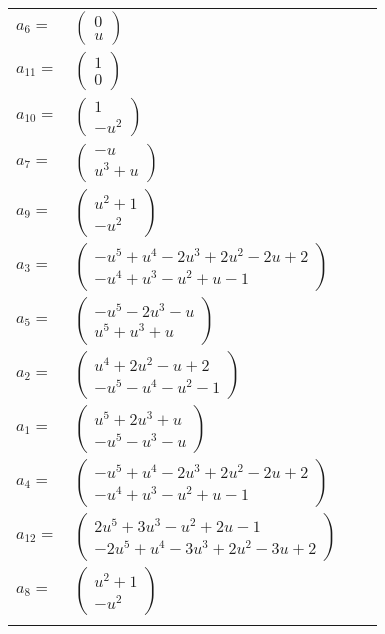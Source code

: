 \documentclass[1p]{elsarticle_modified}
\theoremstyle{definition}
\begin{document}
\begin{tabular}{m{7pt} m{180pt} m{7pt} m{180pt} }
\flushright $a_{6}=$&$\begin{pmatrix}0\\u\end{pmatrix}$ \\
\flushright $a_{11}=$&$\begin{pmatrix}1\\0\end{pmatrix}$ \\
\flushright $a_{10}=$&$\begin{pmatrix}1\\- u^2\end{pmatrix}$ \\
\flushright $a_{7}=$&$\begin{pmatrix}- u\\u^3+u\end{pmatrix}$ \\
\flushright $a_{9}=$&$\begin{pmatrix}u^2+1\\- u^2\end{pmatrix}$ \\
\flushright $a_{3}=$&$\begin{pmatrix}- u^5+u^4-2 u^3+2 u^2-2 u+2\\- u^4+u^3- u^2+u-1\end{pmatrix}$ \\
\flushright $a_{5}=$&$\begin{pmatrix}- u^5-2 u^3- u\\u^5+u^3+u\end{pmatrix}$ \\
\flushright $a_{2}=$&$\begin{pmatrix}u^4+2 u^2- u+2\\- u^5- u^4- u^2-1\end{pmatrix}$ \\
\flushright $a_{1}=$&$\begin{pmatrix}u^5+2 u^3+u\\- u^5- u^3- u\end{pmatrix}$ \\
\flushright $a_{4}=$&$\begin{pmatrix}- u^5+u^4-2 u^3+2 u^2-2 u+2\\- u^4+u^3- u^2+u-1\end{pmatrix}$ \\
\flushright $a_{12}=$&$\begin{pmatrix}2 u^5+3 u^3- u^2+2 u-1\\-2 u^5+u^4-3 u^3+2 u^2-3 u+2\end{pmatrix}$ \\
\flushright $a_{8}=$&$\begin{pmatrix}u^2+1\\- u^2\end{pmatrix}$\\&\end{tabular}
\end{document}
